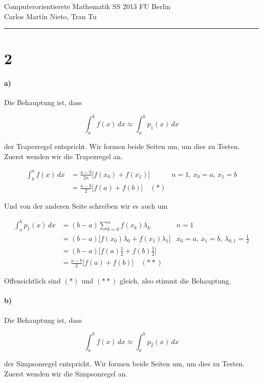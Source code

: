 \documentclass[ngerman,a4paper]{scrartcl}
\begin{document}
{\sffamily
  \hfill
  Computerorientierete Mathematik SS 2013\hfill
  FU Berlin\\[8pt]
  \hfill Carlos Martín Nieto, Tran Tu\hrule \bigskip
}

\section*{2}

\paragraph{a)}

Die Behauptung ist, dass 

\[
\int^b_a f(x)\, dx \approx \int^b_a p_1(x)\, dx
\]

der Trapezregel entspricht. Wir formen beide Seiten um, um dies zu
Testen. Zuerst wenden wir die Trapezregel an.

\begin{align*}
  \int^a_b f(x)\, dx &= \frac{a-b}{2n} \big[ f(x_0) + f(x_1) \big] & n
  = 1,\, x_0 = a,\, x_1 = b\\
  &= \frac{a-b}{2} \big[f(a) + f(b)\big] \quad (*)
\end{align*}

Und von der anderen Seite schreiben wir es auch um

\begin{align*}
  \int^b_a p_1(x)\, dx &= (b-a) \sum^n_{k=0} f(x_k) \lambda_k & n = 1\\
  &= (b-a)\big[f(x_0)\lambda_0 + f(x_1)\lambda_1\big] &  x_0 = a,\, x_1 = b,\, \lambda_{0,1}
  = \frac{1}{2}\\
  &= (b-a)\big[f(a)\frac{1}{2} + f(b)\frac{1}{2}\big]\\
  &= \frac{a-b}{2} \big[f(a) + f(b)\big] \quad (**)
\end{align*}

Offensichtlich sind $(*)$ und $(**)$ gleich, also stimmt die Behauptung.

\paragraph{b)}

Die Behauptung ist, dass 

\[
\int^b_a f(x)\, dx \approx \int^b_a p_2(x)\, dx
\]

der Simpsonregel entspricht. Wir formen beide Seiten um, um dies zu
Testen. Zuerst wenden wir die Simpsonregel an.
\end{document}
